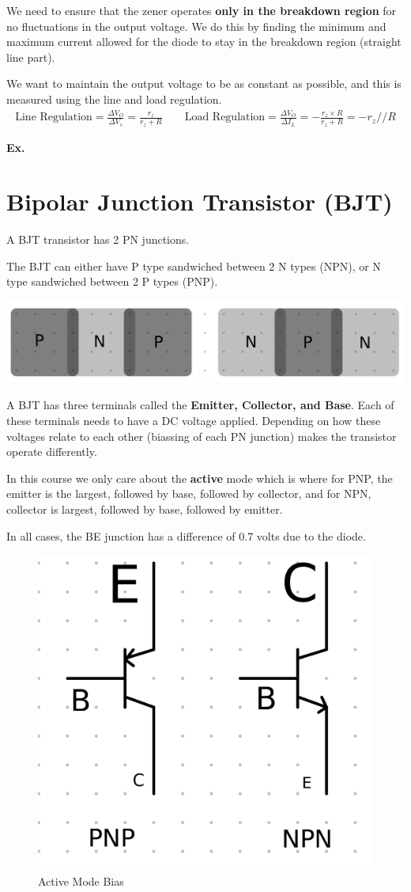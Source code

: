 \documentclass[12pt,letterpaper]{article} \usepackage{amsmath} \usepackage{graphicx} \usepackage[margin=1in]{geometry} \usepackage{longtable}  \usepackage{amssymb}
\begin{document}
	We need to ensure that the zener operates \textbf{only in the breakdown region} for no fluctuations in the output voltage. We do this by finding the minimum and maximum current allowed for the diode to stay in the breakdown region (straight line part).
	
	We want to maintain the output voltage to be as constant as possible, and this is measured using the line and load regulation. 
	\begin{align*}
		\text{Line Regulation}=\frac{\Delta V_O}{\Delta V_s} = \frac{r_z}{r_z+R} \qquad \text{Load Regulation}=\frac{\Delta V_O}{\Delta I_L} = -\frac{r_z\times R}{r_z+R} = -r_z // R
	\end{align*}

	\begin{mdframed}[]
	\textbf{Ex. }
	\end{mdframed}
	
	\section{Bipolar Junction Transistor (BJT)}
	A BJT transistor has 2 PN junctions. 
	
	The BJT can either have P type sandwiched between 2 N types (NPN), or N type sandwiched between 2 P types (PNP). 
	\begin{center}
		\includegraphics[width=0.7\linewidth]{pnp-vs-npn}
	\end{center}
	A BJT has three terminals called the \textbf{Emitter, Collector, and Base}. Each of these terminals needs to have a DC voltage applied. Depending on how these voltages relate to each other (biassing of each PN junction) makes the transistor operate differently. 
	
	In this course we only care about the \textbf{active} mode which is where for PNP, the emitter is the largest, followed by base, followed by collector, and for NPN, collector is largest, followed by base, followed by emitter. 
	
	In all cases, the BE junction has a difference of 0.7 volts due to the diode. 
	\begin{figure}
		\centering
		\includegraphics[width=0.4\linewidth]{bjt-biassing}
		\caption{Active Mode Bias}
		\label{figure:bjt-active-mode-bias}
		
	\end{figure}
	
\end{document}
